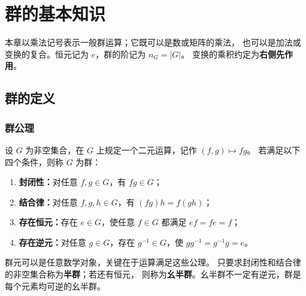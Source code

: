 \chapter{群的基本知识}

本章以乘法记号表示一般群运算；它既可以是数或矩阵的乘法，
也可以是加法或变换的复合。恒元记为 $e$，群的阶记为 $n_G=|G|$。
变换的乘积约定为\textbf{右侧先作用}。

\section{群的定义}
\subsection{群公理}
\begin{definition}[群]
设 $G$ 为非空集合，在 $G$ 上规定一个二元运算，记作 $\left(f,g\right)\mapsto fg$。
若满足以下四个条件，则称 $G$ 为群：
\begin{enumerate}
  \item \textbf{封闭性：}对任意 $f,g\in G$，有 $fg\in G$；
  \item \textbf{结合律：}对任意 $f,g,h\in G$，有 $\left(fg\right)h=f\left(gh\right)$；
  \item \textbf{存在恒元：}存在 $e\in G$，使任意 $f\in G$ 都满足 $ef=fe=f$；
  \item \textbf{存在逆元：}对任意 $g\in G$，存在 $g^{-1}\in G$，使
  $gg^{-1}=g^{-1}g=e$。
\end{enumerate}
\end{definition}

群元可以是任意数学对象，关键在于运算满足这些公理。
只要求封闭性和结合律的非空集合称为\textbf{半群}；若还有恒元，
则称为\textbf{幺半群}。幺半群不一定有逆元，群是每个元素均可逆的幺半群。

